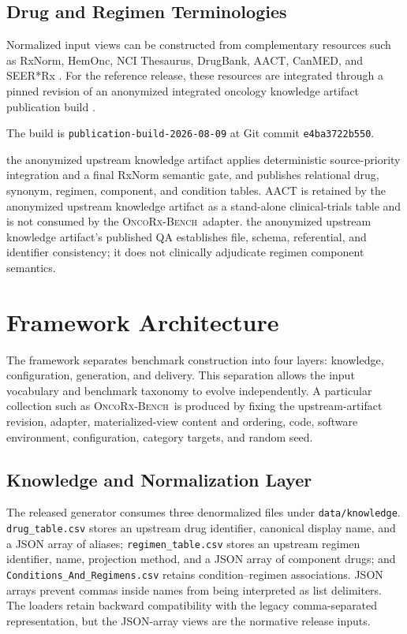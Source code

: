 \documentclass[conference]{IEEEtran}
\newif\ifanonymous
\newcommand{\dataset}{\textsc{OncoRx-Bench}}
\newcommand{\code}[1]{\texttt{#1}}
\newcommand{\kbfull}{an anonymized integrated oncology knowledge artifact}
\newcommand{\kbname}{the anonymized upstream knowledge artifact}
\newcommand{\kbadj}{upstream-artifact}
\newcommand{\kbfull}{the Unified Oncology Treatment Database (UOTD)}
\newcommand{\kbname}{UOTD}
\newcommand{\kbadj}{UOTD}
\begin{document}
\subsection{Drug and Regimen Terminologies}

Normalized input views can be constructed from complementary resources such as
RxNorm, HemOnc, NCI Thesaurus, DrugBank, AACT, CanMED, and SEER*Rx
\cite{nelson2011,warner2019,sioutos2007,knox2024,tasneem2012,
canmed2024,seerrx2026}. For the reference release, these resources are
integrated through a pinned revision of \kbfull{}
publication build \cite{shivanna2026uotd}.
\ifanonymous
The identity-bearing build label and revision are withheld during review.
\else
The build is \code{publication-build-2026-08-09} at Git commit
\code{e4ba3722b550}.
\fi
\kbname{} applies deterministic
source-priority integration and a final RxNorm semantic gate, and publishes
relational drug, synonym, regimen, component, and condition tables. AACT is
retained by \kbname{} as a stand-alone clinical-trials table and is not consumed by
the \dataset\ adapter. \kbname{}'s published QA establishes file, schema,
referential, and identifier consistency; it does not clinically adjudicate
regimen component semantics.

\section{Framework Architecture}
\label{sec:framework}

The framework separates benchmark construction into four layers: knowledge,
configuration, generation, and delivery. This separation allows the input
vocabulary and benchmark taxonomy to evolve independently. A particular
collection such as \dataset\ is produced by fixing the \kbadj{} revision, adapter,
materialized-view content and ordering, code, software environment,
configuration, category targets, and random seed.

\subsection{Knowledge and Normalization Layer}

The released generator consumes three denormalized files under
\code{data/knowledge}. \code{drug\_table.csv} stores an upstream drug identifier,
canonical display name, and a JSON array of aliases;
\code{regimen\_table.csv} stores an upstream regimen identifier, name, projection
method, and a JSON array of component drugs; and
\code{Conditions\_And\_Regimens.csv} retains condition--regimen associations.
JSON arrays prevent commas inside names from being interpreted as list
delimiters. The loaders retain backward compatibility with the legacy
comma-separated representation, but the JSON-array views are the normative
release inputs.
\end{document}
